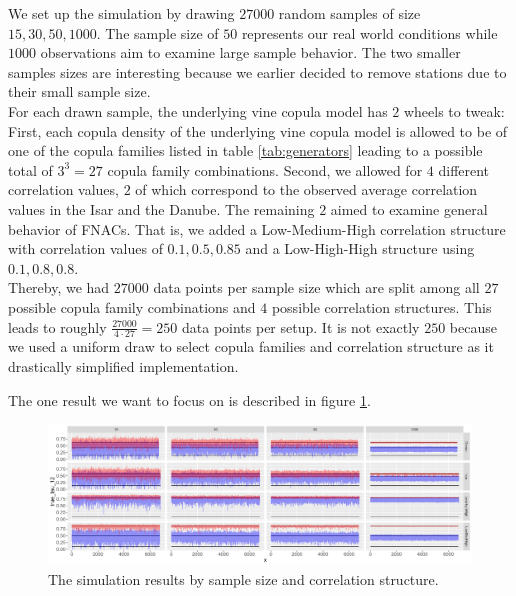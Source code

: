 \documentclass[
]{krantz}
\begin{document}
We set up the simulation by drawing \(27000\) random samples of size \(15, 30, 50, 1000\).
The sample size of \(50\) represents our real world conditions while \(1000\) observations aim to examine large sample behavior. The two smaller samples sizes are interesting because we earlier decided to remove stations due to their small
sample size.\\
For each drawn sample,
the underlying vine copula model has \(2\) wheels to tweak:
First, each copula density
of the underlying vine copula model is allowed to be of one of the copula families
listed in table \ref{tab:generators} leading to a possible total of \(3^3 = 27\) copula family combinations.
Second, we allowed for \(4\) different correlation values, \(2\) of which correspond to the observed average
correlation values in the Isar and the Danube. The remaining \(2\) aimed to examine general behavior of FNACs. That is, we added a Low-Medium-High correlation structure with correlation values of \(0.1, 0.5, 0.85\) and a
Low-High-High structure using \(0.1, 0.8, 0.8\).\\
Thereby, we had \(27000\) data points per sample size which are split among all \(27\) possible copula family combinations
and \(4\) possible correlation structures. This leads to roughly \(\frac{27000}{4\cdot 27} = 250\) data points per setup.
It is not exactly \(250\) because we used a uniform draw to select copula families and correlation
structure as it drastically simplified implementation.

The one result we want to focus on is described in figure \ref{fig:simresults}.

\begin{figure}

{\centering \includegraphics[width=1\linewidth]{work/04-floodfreq/figures/sim_NAC_if_Vine_DPG} 

}

\caption{The simulation results by sample size and correlation structure.}\label{fig:simresults}
\end{figure}
\end{document}
